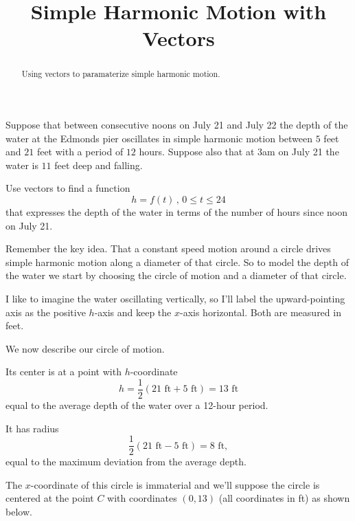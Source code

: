 \documentclass{ximera}
\title{Simple Harmonic Motion with Vectors}
\begin{document}
\begin{abstract}
Using vectors to paramaterize simple harmonic motion.
\end{abstract}
\maketitle


\begin{question} \label{Qoer333fr}
Suppose that between consecutive noons on July 21 and July 22 the depth of the water at the Edmonds pier oscillates in simple harmonic motion between $5$ feet and $21$ feet with a period of $12$ hours. Suppose also that at 3am on July 21 the water is $11$ feet deep and falling.

Use vectors to find a function
\[
  h = f(t) \, , \, 0\leq t \leq 24
\]
that expresses the depth of the water in terms of the number of hours since noon on July 21.

\begin{explanation}

Remember the key idea. That a constant speed motion around a circle drives simple harmonic motion along a diameter of that circle. So to model the depth of the water we start by choosing the circle of motion and a diameter of that circle.

I like to imagine the water oscillating vertically, so I'll label the upward-pointing axis as the positive $h$-axis and keep the $x$-axis horizontal. Both are measured in feet.


We now describe our circle of motion.


Its center is at a point with $h$-coordinate
\[
   h  =  \frac{1}{2}\left( 21 \text{ ft} + 5 \text{ ft} \right) = 13 \text{ ft}
\]
equal to the average depth of the water over a 12-hour period.

It has radius
\[
   \frac{1}{2} \left( 21 \text{ ft} - 5 \text{ ft} \right) = 8\text{ ft} ,
\]
equal to the maximum deviation from the average depth.

The $x$-coordinate of this circle is immaterial and we'll suppose the circle is centered at the point $C$ with coordinates $(0,13)$ (all coordinates in ft) as shown below.


\begin{onlineOnly}
    \begin{center}
\end{center}
\end{onlineOnly}


\end{explanation}
\end{question}
\end{document}

